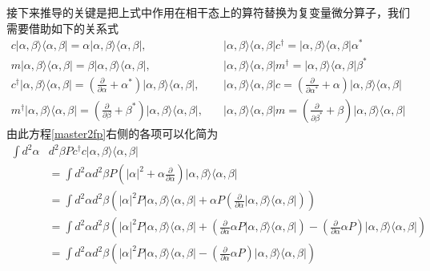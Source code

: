 接下来推导的关键是把上式中作用在相干态上的算符替换为复变量微分算子，我们需要借助如下的关系式
\begin{equation}
\begin{aligned}
c|\alpha,\beta\rangle\langle \alpha,\beta|=\alpha|\alpha,\beta\rangle\langle \alpha,\beta|, &\quad |\alpha,\beta\rangle \langle\alpha,\beta| c^{\dag}=|\alpha,\beta\rangle\langle \alpha,\beta|\alpha^{*} \\
m|\alpha,\beta\rangle \langle\alpha,\beta|=\beta|\alpha,\beta\rangle\langle \alpha,\beta|, &\quad
|\alpha,\beta\rangle\langle \alpha,\beta|m^{\dag}=|\alpha,\beta\rangle\langle \alpha,\beta|\beta^{*} \\
c^{\dag}|\alpha,\beta\rangle\langle \alpha,\beta|=(\frac{\partial}{\partial\alpha}+\alpha^{*})|\alpha,\beta\rangle\langle \alpha,\beta|, &\quad
|\alpha,\beta\rangle\langle \alpha,\beta|c=(\frac{\partial}{\partial\alpha^{*}}+\alpha)|\alpha,\beta\rangle\langle \alpha,\beta| \\
m^{\dag}|\alpha,\beta\rangle\langle \alpha,\beta|=(\frac{\partial}{\partial\beta}+\beta^{*})|\alpha,\beta\rangle\langle \alpha,\beta|, &\quad
|\alpha,\beta\rangle\langle \alpha,\beta|m=(\frac{\partial}{\partial\beta^{*}}+\beta)|\alpha,\beta\rangle\langle \alpha,\beta|
\end{aligned}
\end{equation}
由此方程\eqref{master2fp}右侧的各项可以化简为
\begin{equation}
\begin{aligned}
\int d^{2}\alpha & d^{2}\beta Pc^{\dag}c|\alpha,\beta\rangle \langle \alpha,\beta| \\
&= \int d^{2}\alpha d^{2}\beta P(|\alpha|^{2}+\alpha\frac{\partial}{\partial\alpha})|\alpha,\beta\rangle \langle \alpha,\beta| \\
&= \int d^{2}\alpha d^{2}\beta \left(|\alpha|^{2}P|\alpha,\beta\rangle \langle \alpha,\beta|+\alpha P(\frac{\partial}{\partial\alpha}|\alpha,\beta\rangle \langle \alpha,\beta|)\right) \\
&= \int d^{2}\alpha d^{2}\beta \left(|\alpha|^{2}P|\alpha,\beta\rangle \langle \alpha,\beta|+(\frac{\partial}{\partial\alpha}\alpha P|\alpha,\beta\rangle \langle \alpha,\beta|)-(\frac{\partial}{\partial\alpha}\alpha P)|\alpha,\beta\rangle \langle \alpha,\beta|\right) \\
&= \int d^{2}\alpha d^{2}\beta \left(|\alpha|^{2}P|\alpha,\beta\rangle \langle \alpha,\beta|-(\frac{\partial}{\partial\alpha}\alpha P)|\alpha,\beta\rangle \langle \alpha,\beta|\right)
\end{aligned}
\end{equation}
